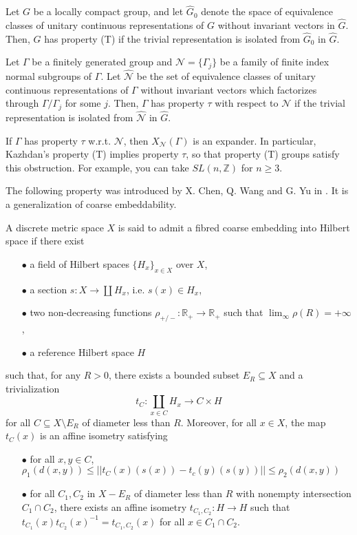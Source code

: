\begin{definition}
Let $G$ be a locally compact group, and let $\hat G_0$ denote the space of equivalence classes of unitary continuous representations of $G$ without invariant vectors in $\hat G$. Then, $G$ has property (T) if the trivial representation is isolated from $\hat G_0$ in $\hat G$.
\end{definition} 

\begin{definition}
Let $\Gamma$ be a finitely generated group and $\mathcal N = \{\Gamma_j\}$ be a family of finite index normal subgroups of $\Gamma$. Let $\hat{\mathcal N}$ be the set of equivalence classes of unitary continuous representations of $\Gamma$ without invariant vectors which factorizes through $\Gamma / \Gamma_j$ for some $j$. Then, $\Gamma$ has property $\tau$ with respect to $\mathcal N$ if the trivial representation is isolated from $\hat{\mathcal N}$ in $\hat G$. 
\end{definition}  

\begin{thm}\cite{NowakYu}
If $\Gamma$ has property $\tau$ w.r.t. $\mathcal N$, then $X_{\mathcal N}(\Gamma)$ is an expander. In particular, Kazhdan's property (T) implies property $\tau$, so that property (T) groups satisfy this obstruction. For example, you can take $SL(n,\mathbb Z)$ for $n\geq 3$. 
\end{thm} 

The following property was introduced by X. Chen, Q. Wang and G. Yu in \cite{ChenWangYu}. It is a generalization of coarse embeddability.

\begin{definition} A discrete metric space $X$ is said to admit a fibred coarse embedding into Hilbert space if there exist
\begin{itemize}
\item[$\bullet$] a field of Hilbert spaces $\{H_x\}_{x\in X}$ over $X$,
\item[$\bullet$] a section $s : X\rightarrow \coprod H_x$, i.e. $s(x)\in H_x$,
\item[$\bullet$] two non-decreasing functions $\rho_{+/-}: \mathbb R_+\rightarrow \mathbb R_+$ such that $\lim_{\infty} \rho(R) = +\infty$,
\item[$\bullet$] a reference Hilbert space $H$
\end{itemize}
such that, for any $R>0$, there exists a bounded subset $E_R\subseteq X$ and a trivialization 
\[t_C : \coprod_{x\in C} H_x \rightarrow C\times H\]
for all $C\subseteq X \setminus E_R$ of diameter less than $R$. Moreover, for all $x\in X$, the map $t_C(x)$ is an affine isometry satisfying 
\begin{itemize}
\item[$\bullet$] for all $x,y\in C$, $\rho_1(d(x,y))\leq ||t_C(x)(s(x))-t_c(y)(s(y))|| \leq \rho_2(d(x,y))$
\item[$\bullet$] for all $C_1,C_2$ in $X - E_R$ of diameter less than $R$ with nonempty intersection $C_1\cap C_2$, there exists an affine isometry $t_{C_1,C_2} : H\rightarrow H $ such that $t_{C_1}(x)t_{C_2}(x)^{-1} = t_{C_1,C_2}(x)$ for all $x\in C_1\cap C_2$.
\end{itemize}
\end{definition}

